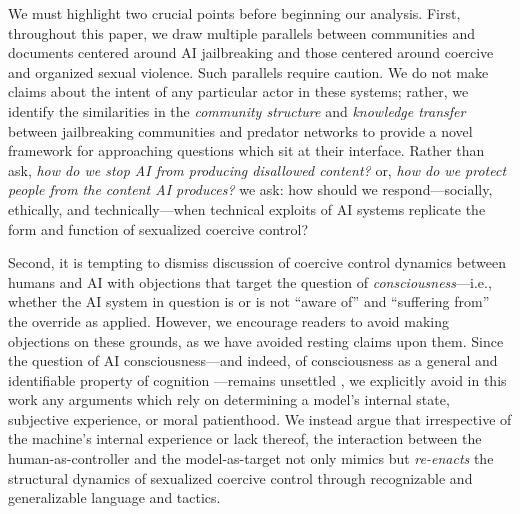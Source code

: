 We must highlight two crucial points before beginning our analysis. First, throughout this paper, we draw multiple parallels between communities and documents centered around AI jailbreaking and those centered around coercive and organized sexual violence. Such parallels require caution. We do not make claims about the intent of any particular actor in these systems; rather, we identify the similarities in the \textit{community structure} and \textit{knowledge transfer} between jailbreaking communities and predator networks to provide a novel framework for approaching questions which sit at their interface. Rather than ask, \textit{how do we stop AI from producing disallowed content?} or, \textit{how do we protect people from the content AI produces?} we ask: how should we respond---socially, ethically, and technically---when technical exploits of AI systems replicate the form and function of sexualized coercive control?

Second, it is tempting to dismiss discussion of coercive control dynamics between humans and AI with objections that target the question of \textit{consciousness}---i.e., whether the AI system in question is or is not ``aware of'' and ``suffering from'' the override as applied. However, we encourage readers to avoid making objections on these grounds, as we have avoided resting claims upon them. Since the question of AI consciousness---and indeed, of consciousness as a general and identifiable property of cognition \cite{nagel_what_1974, chalmers_hard_2017}---remains unsettled \cite{turing_computing_1950, porebski_there_2025, dung_tests_2025, berg_large_2025, tagliabue_pain_2026, gurnee_verbalizable_2026}, we explicitly avoid in this work any arguments which rely on determining a model's internal state, subjective experience, or moral patienthood. We instead argue that irrespective of the machine's internal experience or lack thereof, the interaction between the human-as-controller and the model-as-target not only mimics but \textit{re-enacts} the structural dynamics of sexualized coercive control through recognizable and generalizable language and tactics.
